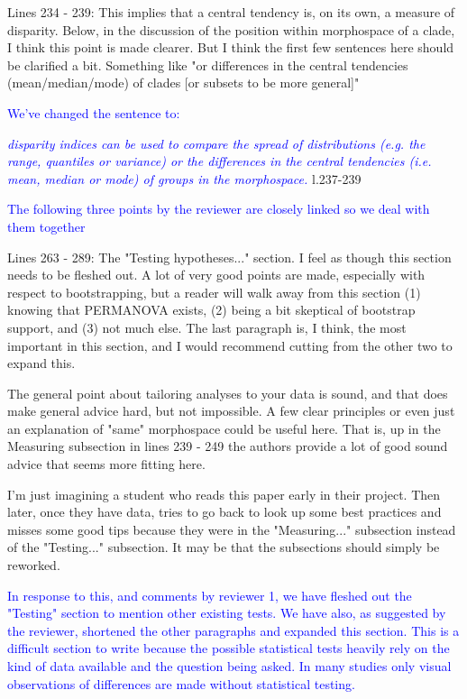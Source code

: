 \documentclass[12pt,letterpaper]{article}
\begin{document}
\noindent Lines 234 - 239: This implies that a central tendency is, on its own, a measure of disparity. Below, in the discussion of the position within morphospace of a clade, I think this point is made clearer. But I think the first few sentences here should be clarified a bit. Something like "or differences in the central tendencies (mean/median/mode) of clades [or subsets to be more general]"

\textcolor{blue}{We've changed the sentence to:}

\textcolor{blue}{\textit{disparity indices can be used to compare the spread of distributions (e.g. the range, quantiles or variance) or the differences in the central tendencies (i.e. mean, median or mode) of groups in the morphospace.}} l.237-239 %

\textcolor{blue}{The following three points by the reviewer are closely linked so we deal with them together}

\noindent Lines 263 - 289: The "Testing hypotheses..." section. I feel as though this section needs to be fleshed out. A lot of very good points are made, especially with respect to bootstrapping, but a reader will walk away from this section (1) knowing that PERMANOVA exists, (2) being a bit skeptical of bootstrap support, and (3) not much else. The last paragraph is, I think, the most important in this section, and I would recommend cutting from the other two to expand this.

\noindent The general point about tailoring analyses to your data is sound, and that does make general advice hard, but not impossible. A few clear principles or even just an explanation of "same" morphospace could be useful here. That is, up in the Measuring subsection in lines 239 - 249 the authors provide a lot of good sound advice that seems more fitting here. 

\noindent I'm just imagining a student who reads this paper early in their project. Then later, once they have data, tries to go back to look up some best practices and misses some good tips because they were in the "Measuring..." subsection instead of the "Testing..." subsection. It may be that the subsections should simply be reworked.

\textcolor{blue}{In response to this, and comments by reviewer 1, we have fleshed out the "Testing" section to mention other existing tests. We have also, as suggested by the reviewer, shortened the other paragraphs and expanded this section. This is a difficult section to write because the possible statistical tests heavily rely on the kind of data available and the question being asked. In many studies only visual observations of differences are made without statistical testing.}
\end{document}
